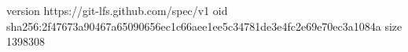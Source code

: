 version https://git-lfs.github.com/spec/v1
oid sha256:2f47673a90467a65090656ec1c66aee1ee5c34781de3e4fc2e69e70ec3a1084a
size 1398308
